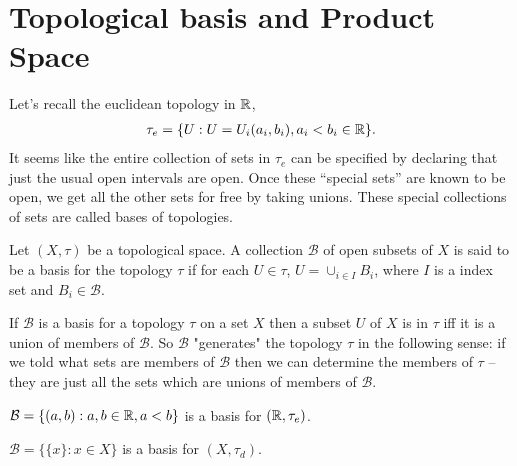 \chapter{Topological basis and Product Space}\label{chp:1_3}

Let's recall the euclidean topology in $\mathbb{R}$, 
\begin{align*}
    \tau_e = \{U:U=U_i(a_i,b_i),a_i<b_i\in\mathbb{R}\}.
\end{align*}
It seems like the entire collection of sets
in $\tau_e$ can be specified by declaring that just the usual open intervals are open. Once these
“special sets” are known to be open, we get all the other sets for free by taking unions.
These special collections of sets are called bases of topologies.

\begin{definition}{}{}
    Let $(X,\tau)$ be a topological space. 
    A collection $\mathcal{B}$ of open subsets of $X$ is said to be a basis for the topology $\tau$
    if for each $U\in \tau$, $U=\cup_{i\in I} B_i$, where $I$ is a index set and $B_i\in\mathcal{B}$.
\end{definition}

\begin{remark}
    If $\mathcal{B}$ is a basis for a topology $\tau$ on a set $X$ then
    a subset $U$ of $X$ is in $\tau$ iff it is a union of members of $\mathcal{B}$.
    So $\mathcal{B}$ "generates" the topology $\tau$ in the following sense:
    if we told what sets are members of $\mathcal{B}$ then we can determine the members of $\tau$ -- 
    they are just all the sets which are unions of members of $\mathcal{B}$.
\end{remark}

\begin{example}{}{}
    $\mathcal{B}=\{(a,b):a,b\in\mathbb{R},a<b\}$ is a basis for $(\mathbb{R},\tau_e)$.
\end{example}

\begin{example}{}{}
    $\mathcal{B}=\{\{x\}:x\in X\}$ is a basis for $(X,\tau_d)$. 
\end{example}

